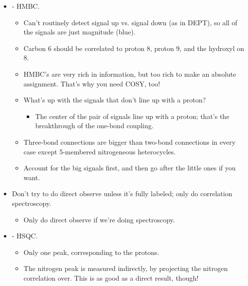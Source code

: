 \documentclass[../notes.tex]{subfiles}
\begin{document}
\begin{itemize}
    \begin{itemize}
        \item We don't like to use it because it's hard to get rid of.
        \item But if you use a gentle stream of dry nitrogen on your \SI{0.5}{\milli\liter} sample, it will get rid of the DMSO in about half a day!
    \end{itemize}
    \item {}- HMBC.
    \begin{itemize}
        \item Can't routinely detect signal up vs. signal down (as in DEPT), so all of the signals are just magnitude (blue).
        \item Carbon 6 should be correlated to proton 8, proton 9, and the hydroxyl on 8.
        \item HMBC's are very rich in information, but too rich to make an absolute assignment. That's why you need COSY, too!
        \item What's up with the signals that don't line up with a proton?
        \begin{itemize}
            \item The center of the pair of signals line up with a proton; that's the breakthrough of the one-bond coupling.
        \end{itemize}
        \item Three-bond connections are bigger than two-bond connections in every case except 5-membered nitrogeneous heterocycles.
        \item Account for the big signals first, and then go after the little ones if you want.
    \end{itemize}
    \item Don't try to do direct observe  unless it's fully labeled; only do correlation spectroscopy.
    \begin{itemize}
        \item Only do direct observe if we're doing  spectroscopy.
    \end{itemize}
    \item {}- HSQC.
    \begin{itemize}
        \item Only one peak, corresponding to the  protons.
        \item The nitrogen peak is measured indirectly, by projecting the nitrogen correlation over. This is as good as a direct result, though!

\end{itemize}
\end{itemize}
\end{document}
